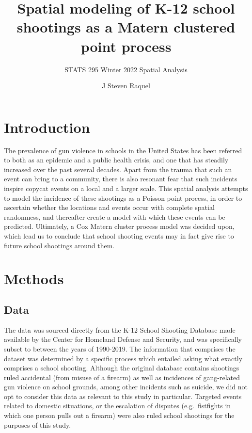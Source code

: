 \documentclass[
  12pt,
]{article}
\title{Spatial modeling of K-12 school shootings as a Matern clustered
point process}
\subtitle{STATS 295 Winter 2022 Spatial Analysis}
\author{J Steven Raquel}
\date{}
\begin{document}
\maketitle

\hypertarget{introduction}{%
\section{Introduction}\label{introduction}}

The prevalence of gun violence in schools in the United States has been
referred to both as an epidemic and a public health crisis, and one that
has steadily increased over the past several decades. Apart from the
trauma that such an event can bring to a community, there is also
resonant fear that such incidents inspire copycat events on a local and
a larger scale. This spatial analysis attempts to model the incidence of
these shootings as a Poisson point process, in order to ascertain
whether the locations and events occur with complete spatial randomness,
and thereafter create a model with which these events can be predicted.
Ultimately, a Cox Matern cluster process model was decided upon, which
lead us to conclude that school shooting events may in fact give rise to
future school shootings around them.

\hypertarget{methods}{%
\section{Methods}\label{methods}}

\hypertarget{data}{%
\subsection{Data}\label{data}}

The data was sourced directly from the K-12 School Shooting Database
made available by the Center for Homeland Defense and Security, and was
specifically subset to between the years of 1990-2019. The information
that comprises the dataset was determined by a specific process which
entailed asking what exactly comprises a school shooting. Although the
original database contains shootings ruled accidental (from misuse of a
firearm) as well as incidences of gang-related gun violence on school
grounds, among other incidents such as suicide, we did not opt to
consider this data as relevant to this study in particular. Targeted
events related to domestic situations, or the escalation of disputes
(e.g.~fistfights in which one person pulls out a firearm) were also
ruled school shootings for the purposes of this study.
\end{document}
